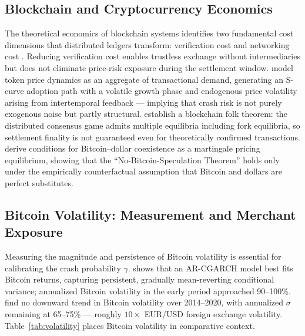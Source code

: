 \documentclass{article}
\begin{document}
\subsection{Blockchain and Cryptocurrency Economics}

The theoretical economics of blockchain systems identifies two fundamental cost
dimensions that distributed ledgers transform: verification cost and networking
cost \citep{catalini2016}.
Reducing verification cost enables trustless exchange without intermediaries but
does not eliminate price-risk exposure during the settlement window.
\citet{cong2021} model token price dynamics as an aggregate of transactional
demand, generating an S-curve adoption path with a volatile growth phase and
endogenous price volatility arising from intertemporal feedback --- implying
that crash risk is not purely exogenous noise but partly structural.
\citet{biais2019} establish a blockchain folk theorem: the distributed consensus
game admits multiple equilibria including fork equilibria, so settlement
finality is not guaranteed even for theoretically confirmed transactions.
\citet{schilling2019} derive conditions for Bitcoin--dollar coexistence as a
martingale pricing equilibrium, showing that the ``No-Bitcoin-Speculation
Theorem'' holds only under the empirically counterfactual assumption that
Bitcoin and dollars are perfect substitutes.

\subsection{Bitcoin Volatility: Measurement and Merchant Exposure}

Measuring the magnitude and persistence of Bitcoin volatility is essential for
calibrating the crash probability $\gamma$.
\citet{katsiampa2017} shows that an AR-CGARCH model best fits Bitcoin returns,
capturing persistent, gradually mean-reverting conditional variance;
annualized Bitcoin volatility in the early period approached 90--100\%.
\citet{baur2021} find no downward trend in Bitcoin volatility over 2014--2020,
with annualized $\sigma$ remaining at 65--75\% --- roughly $10\times$ EUR/USD
foreign exchange volatility.
Table~\ref{tab:volatility} places Bitcoin volatility in comparative context.
\end{document}
